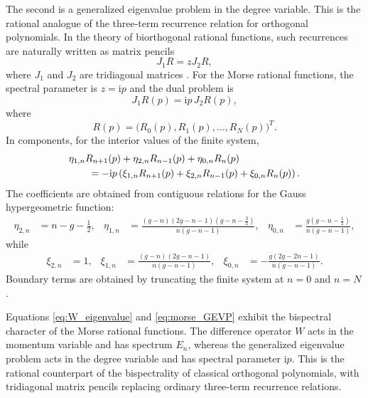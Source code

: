 \documentclass[11pt,reqno]{amsart}
\newcommand{\ii}{\mathrm{i}}
\numberwithin{equation}{section}
\begin{document}
The second is a generalized eigenvalue problem in the degree variable.  This is the rational
analogue of the three-term recurrence relation for orthogonal polynomials.  In the theory of
biorthogonal rational functions, such recurrences are naturally written as matrix pencils
\begin{equation}
  J_1 R=zJ_2 R,
  \label{eq:abstract_GEVP}
\end{equation}
where $J_1$ and $J_2$ are tridiagonal matrices \cite{Zhedanov1999}.  For the Morse rational
functions, the spectral parameter is $z=\ii p$ and the dual problem is
\begin{equation}
  J_1R(p)=\ii p\,J_2R(p),
  \label{eq:morse_GEVP}
\end{equation}
where
\begin{equation}
  R(p)=\bigl(R_0(p),R_1(p),\dots,R_N(p)\bigr)^T.
\end{equation}
In components, for the interior values of the finite system,
\begin{align}
  &\eta_{1,n}R_{n+1}(p)+\eta_{2,n}R_{n-1}(p)+\eta_{0,n}R_n(p)
  \notag\\
  &\qquad
  =-\ii p\left(
  \xi_{1,n}R_{n+1}(p)+\xi_{2,n}R_{n-1}(p)+\xi_{0,n}R_n(p)
  \right).
  \label{eq:component_GEVP}
\end{align}
The coefficients are obtained from contiguous relations for the Gauss hypergeometric function:
\begin{align}
  \eta_{2,n}&=n-g-\frac12,
  &
  \eta_{1,n}&=
  \frac{(g-n)(2g-n-1)(g-n-\frac32)}{n(g-n-1)},
  &
  \eta_{0,n}&=
  \frac{g(g-n-\frac12)}{n(g-n-1)},
  \label{eq:eta_coefficients}
\end{align}
while
\begin{align}
  \xi_{2,n}&=1,
  &
  \xi_{1,n}&=
  \frac{(g-n)(2g-n-1)}{n(g-n-1)},
  &
  \xi_{0,n}&=-
  \frac{g(2g-2n-1)}{n(g-n-1)}.
  \label{eq:xi_coefficients}
\end{align}
Boundary terms are obtained by truncating the finite system at $n=0$ and $n=N$.

Equations \eqref{eq:W_eigenvalue} and \eqref{eq:morse_GEVP} exhibit the bispectral character of
the Morse rational functions.  The difference operator $W$ acts in the momentum variable and has
spectrum $E_n$, whereas the generalized eigenvalue problem acts in the degree variable and has
spectral parameter $\ii p$.  This is the rational counterpart of the bispectrality of classical
orthogonal polynomials, with tridiagonal matrix pencils replacing ordinary three-term recurrence
relations.
\end{document}
